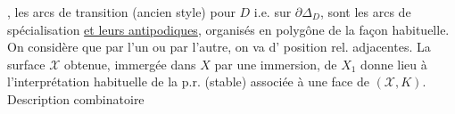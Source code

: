 , les arcs de transition (ancien style) pour $D$ i.e. sur $\partial\Delta_D$, sont les arcs de spécialisation \uline{et leurs antipodiques}, organisés en polygône de la façon habituelle. On considère que par l'un ou par l'autre, on va d' position rel. adjacentes.
La surface $\mathcal X$ obtenue, immergée dans $X$ par une immersion,   de $X_1$  donne lieu à  l'interprétation habituelle de la p.r. (stable) associée à une face de $(\mathcal X,K)$.
Description combinatoire

